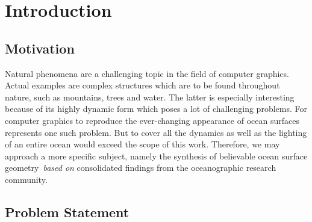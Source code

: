 \chapter{Introduction}
\label{ch:intro}
%
\section{Motivation}
\label{sec:motivation}

Natural phenomena are a challenging topic in the field of computer graphics.
Actual examples are complex structures which are to be found throughout nature,
such as mountains, trees and water. The latter is especially interesting
because of its highly dynamic form which poses a lot of challenging problems.
For computer graphics to reproduce the ever-changing appearance of ocean
surfaces represents one such problem. But to cover all the dynamics as well
as the lighting of an entire ocean would exceed the scope of this work.
Therefore, we may approach a more specific subject, namely the synthesis of 
believable ocean surface geometry~\emph{based on} consolidated findings from the
oceanographic research community.


% 
% 
% 

\section{Problem Statement}
\label{sec:problem_statement}


